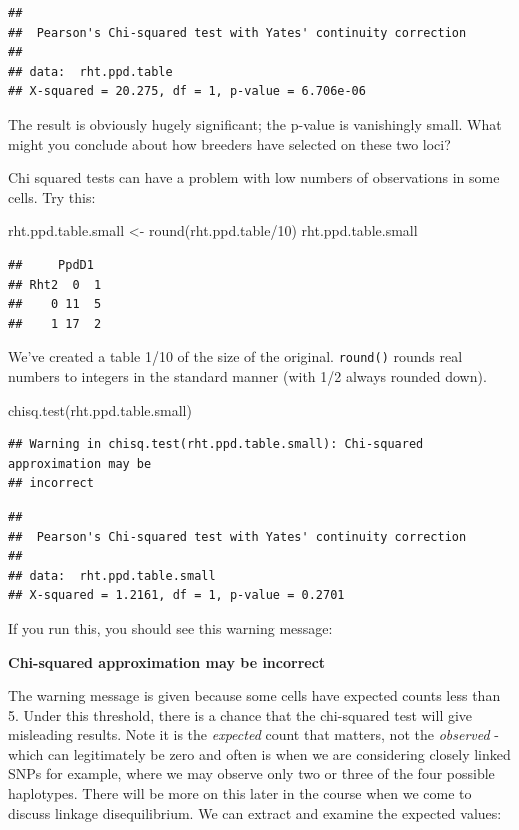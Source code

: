 \documentclass[
]{book}
\newenvironment{Shaded}{\begin{snugshade}}{\end{snugshade}}
\newcommand{\DecValTok}[1]{\textcolor[rgb]{0.00,0.00,0.81}{#1}}
\newcommand{\FunctionTok}[1]{\textcolor[rgb]{0.00,0.00,0.00}{#1}}
\newcommand{\NormalTok}[1]{#1}
\newcommand{\OtherTok}[1]{\textcolor[rgb]{0.56,0.35,0.01}{#1}}
\newcommand{\SpecialCharTok}[1]{\textcolor[rgb]{0.00,0.00,0.00}{#1}}
\begin{document}
\begin{verbatim}
## 
##  Pearson's Chi-squared test with Yates' continuity correction
## 
## data:  rht.ppd.table
## X-squared = 20.275, df = 1, p-value = 6.706e-06
\end{verbatim}

The result is obviously hugely significant; the p-value is vanishingly small. What might you conclude about how breeders have selected on these two loci?

Chi squared tests can have a problem with low numbers of observations in some cells. Try
this:

\begin{Shaded}
\begin{Highlighting}[]
\NormalTok{rht.ppd.table.small }\OtherTok{\textless{}{-}} \FunctionTok{round}\NormalTok{(rht.ppd.table}\SpecialCharTok{/}\DecValTok{10}\NormalTok{)}
\NormalTok{rht.ppd.table.small}
\end{Highlighting}
\end{Shaded}

\begin{verbatim}
##     PpdD1
## Rht2  0  1
##    0 11  5
##    1 17  2
\end{verbatim}

We've created a table 1/10 of the size of the original. \texttt{round()} rounds real numbers to integers in the standard manner (with 1/2 always rounded down).

\begin{Shaded}
\begin{Highlighting}[]
\FunctionTok{chisq.test}\NormalTok{(rht.ppd.table.small)}
\end{Highlighting}
\end{Shaded}

\begin{verbatim}
## Warning in chisq.test(rht.ppd.table.small): Chi-squared approximation may be
## incorrect
\end{verbatim}

\begin{verbatim}
## 
##  Pearson's Chi-squared test with Yates' continuity correction
## 
## data:  rht.ppd.table.small
## X-squared = 1.2161, df = 1, p-value = 0.2701
\end{verbatim}

If you run this, you should see this warning message:

\textbf{Chi-squared approximation may be incorrect}

The warning message is given because some cells have expected counts less than 5. Under this threshold, there is a chance that the chi-squared test will give misleading results. Note it is the \emph{expected} count that matters, not the \emph{observed} - which can legitimately be zero and often is when we are considering closely linked SNPs for example, where we may observe only two or three of the four possible haplotypes. There will be more on this later in the course when we come to discuss linkage disequilibrium. We can extract and examine the expected values:
\end{document}
